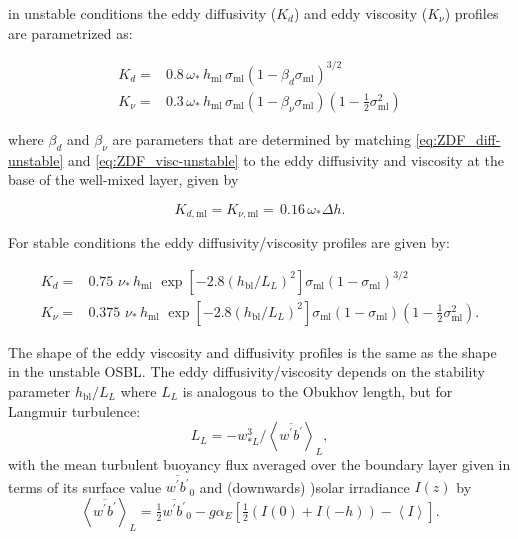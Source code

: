 \documentclass[../main/NEMO_manual]{subfiles}
\begin{document}
in unstable conditions the eddy diffusivity ($K_d$) and eddy viscosity ($K_\nu$) profiles are parametrized as:

\begin{align}
  \label{eq:ZDF_diff-unstable}
  K_d=&0.8\, \omega_*\, h_{\mathrm{ml}} \, \sigma_{\mathrm{ml}} \left(1-\beta_d \sigma_{\mathrm{ml}}\right)^{3/2}
  \\
  \label{eq:ZDF_visc-unstable}
  K_\nu =& 0.3\, \omega_* \,h_{\mathrm{ml}}\, \sigma_{\mathrm{ml}} \left(1-\beta_\nu \sigma_{\mathrm{ml}}\right)\left(1-\tfrac{1}{2}\sigma_{\mathrm{ml}}^2\right)
\end{align}

where $\beta_d$ and $\beta_\nu$ are parameters that are determined by matching \autoref{eq:ZDF_diff-unstable} and \autoref{eq:ZDF_visc-unstable} to the eddy diffusivity and viscosity at the base of the well-mixed layer, given by

\begin{equation}
  \label{eq:ZDF_diff-wml-base}
  K_{d,\mathrm{ml}}=K_{\nu,\mathrm{ml}}=\,0.16\,\omega_* \Delta h.
\end{equation}

For stable conditions the eddy diffusivity/viscosity profiles are given by:

\begin{align}
  \label{eq:ZDF_diff-stable}
  K_d= & 0.75\,\, \nu_*\, h_{\mathrm{ml}}\,\,  \exp\left[-2.8
       \left(h_{\mathrm{bl}}/L_L\right)^2\right]\sigma_{\mathrm{ml}}
       \left(1-\sigma_{\mathrm{ml}}\right)^{3/2} \\
  \label{eq:ZDF_visc-stable}
  K_\nu = & 0.375\,\,  \nu_*\, h_{\mathrm{ml}} \,\, \exp\left[-2.8 \left(h_{\mathrm{bl}}/L_L\right)^2\right] \sigma_{\mathrm{ml}} \left(1-\sigma_{\mathrm{ml}}\right)\left(1-\tfrac{1}{2}\sigma_{\mathrm{ml}}^2\right).
\end{align}

The shape of the eddy viscosity and diffusivity profiles is the same as the shape in the unstable OSBL. The eddy diffusivity/viscosity depends on the stability parameter $h_{\mathrm{bl}}/{L_L}$ where $ L_L$ is analogous to the Obukhov length, but for Langmuir turbulence:
\begin{equation}
  \label{eq:ZDF_L_L}
  L_L=-w_{*L}^3/\left<\overline{w^\prime b^\prime}\right>_L,
\end{equation}
with the mean turbulent buoyancy flux averaged over the boundary layer given in terms of its surface value $\overline{w^\prime b^\prime}_0$ and (downwards) )solar irradiance $I(z)$ by
\begin{equation}
  \label{eq:ZDF_stable-av-buoy-flux}
  \left<\overline{w^\prime b^\prime}\right>_L = \tfrac{1}{2} {\overline{w^\prime b^\prime}}_0-g\alpha_E\left[\tfrac{1}{2}(I(0)+I(-h))-\left<I\right>\right].
\end{equation}
\end{document}
